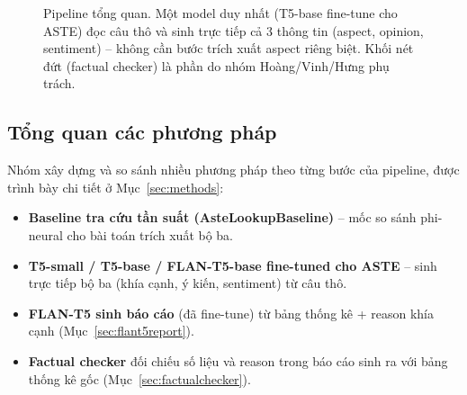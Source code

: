\documentclass[11pt,a4paper]{article}
\begin{document}
\begin{figure}[h]
\centering
{}
\caption{Pipeline tổng quan. Một model duy nhất (T5-base fine-tune cho ASTE)
đọc câu thô và sinh trực tiếp cả 3 thông tin (aspect, opinion, sentiment) --
không cần bước trích xuất aspect riêng biệt. Khối nét đứt (factual checker)
là phần do nhóm Hoàng/Vinh/Hưng phụ trách.}
\label{fig:pipeline}
\end{figure}

\subsection{Tổng quan các phương pháp}

Nhóm xây dựng và so sánh nhiều phương pháp theo từng bước của pipeline,
được trình bày chi tiết ở Mục~\ref{sec:methods}:

\begin{itemize}
    \item \textbf{Baseline tra cứu tần suất (AsteLookupBaseline)} -- mốc
        so sánh phi-neural cho bài toán trích xuất bộ ba.
    \item \textbf{T5-small / T5-base / FLAN-T5-base fine-tuned cho ASTE} --
        sinh trực tiếp bộ ba (khía cạnh, ý kiến, sentiment) từ câu thô.
    \item \textbf{FLAN-T5 sinh báo cáo} (đã fine-tune) từ bảng thống kê +
        reason khía cạnh (Mục~\ref{sec:flant5report}).
    \item \textbf{Factual checker} đối chiếu số liệu và reason trong báo
        cáo sinh ra với bảng thống kê gốc (Mục~\ref{sec:factualchecker}).
\end{itemize}
\end{document}
